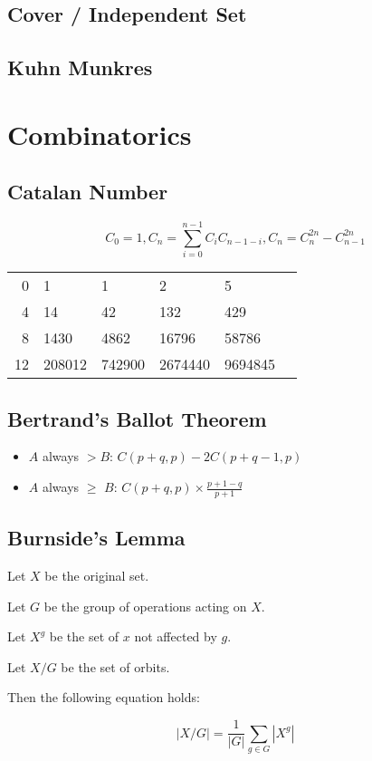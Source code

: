\documentclass[a4paper,10pt,twocolumn,oneside]{article}
\begin{document}
\subsection{Cover / Independent Set}


\subsection{Kuhn Munkres}


\section{Combinatorics}

\subsection{Catalan Number}
$$
C_0=1, C_n=\sum_{i=0}^{n-1} C_i C_{n-1-i}, C_n=C_n^{2n}-C_{n-1}^{2n}
$$

\begin{center}
    \begin{tabular}{r|lllll}
        0 & 1 & 1 & 2 & 5 \\
        4 & 14 & 42 & 132 & 429 \\
        8 & 1430 & 4862 & 16796 & 58786 \\
        12 & 208012 & 742900 & 2674440 & 9694845
    \end{tabular}
\end{center}


\subsection{Bertrand's Ballot Theorem}

\begin{itemize}
    \item $A$ always $> B$: $C(p+q, p) - 2 C(p+q-1, p)$
    \item $A$ always $\geq$ $B$: $C(p+q, p) \times \frac{p + 1 - q}{p + 1}$
\end{itemize}


\subsection{Burnside's Lemma}
{\normalsize
Let $X$ be the original set.

Let $G$ be the group of operations acting on $X$.

Let $X^g$ be the set of $x$ not affected by $g$.

Let $X/G$ be the set of orbits.

Then the following equation holds:

$$
|X/G| = \frac{1}{|G|} \sum_{g \in G} |X^g|
$$
}
\end{document}
